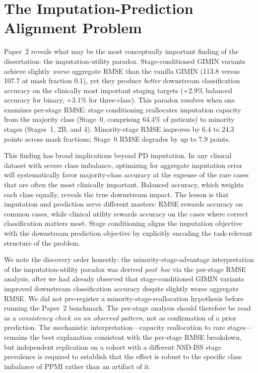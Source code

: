 \section{The Imputation-Prediction Alignment Problem}
\label{sec:paradox}

Paper~2 reveals what may be the most conceptually important finding of the dissertation: the imputation-utility paradox. Stage-conditioned GIMIN variants achieve slightly \textit{worse} aggregate RMSE than the vanilla GIMIN (113.8 versus 107.7 at mask fraction 0.1), yet they produce \textit{better} downstream classification accuracy on the clinically most important staging targets (+2.9\% balanced accuracy for binary, +3.1\% for three-class). This paradox resolves when one examines per-stage RMSE: stage conditioning reallocates imputation capacity from the majority class (Stage~0, comprising 64.4\% of patients) to minority stages (Stages~1, 2B, and 4). Minority-stage RMSE improves by 6.4 to 24.3 points across mask fractions; Stage~0 RMSE degrades by up to 7.9 points.

This finding has broad implications beyond PD imputation. In any clinical dataset with severe class imbalance, optimizing for aggregate imputation error will systematically favor majority-class accuracy at the expense of the rare cases that are often the most clinically important. Balanced accuracy, which weights each class equally, reveals the true downstream impact. The lesson is that imputation and prediction serve different masters: RMSE rewards accuracy on common cases, while clinical utility rewards accuracy on the cases where correct classification matters most. Stage conditioning aligns the imputation objective with the downstream prediction objective by explicitly encoding the task-relevant structure of the problem.

We note the discovery order honestly: the minority-stage-advantage interpretation of the imputation-utility paradox was derived \emph{post~hoc} via the per-stage RMSE analysis, after we had already observed that stage-conditioned GIMIN variants improved downstream classification accuracy despite slightly worse aggregate RMSE. We did not pre-register a minority-stage-reallocation hypothesis before running the Paper~2 benchmark. The per-stage analysis should therefore be read as a \emph{consistency check on an observed pattern}, not as confirmation of a prior prediction. The mechanistic interpretation---capacity reallocation to rare stages---remains the best explanation consistent with the per-stage RMSE breakdown, but independent replication on a cohort with a different NSD-ISS stage prevalence is required to establish that the effect is robust to the specific class imbalance of PPMI rather than an artifact of it.

